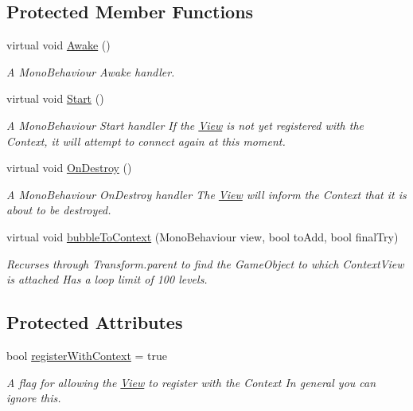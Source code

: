 \subsection*{Protected Member Functions}
\begin{DoxyCompactItemize}
\item 
virtual void \hyperlink{classstrange_1_1extensions_1_1mediation_1_1impl_1_1_view_ac8f8bc798a6729e44cc4f8d6dc3ee838}{Awake} ()
\begin{DoxyCompactList}\small\item\em A Mono\-Behaviour Awake handler. \end{DoxyCompactList}\item 
virtual void \hyperlink{classstrange_1_1extensions_1_1mediation_1_1impl_1_1_view_a9a876bf06590c1a1bacb243311489500}{Start} ()
\begin{DoxyCompactList}\small\item\em A Mono\-Behaviour Start handler If the \hyperlink{classstrange_1_1extensions_1_1mediation_1_1impl_1_1_view}{View} is not yet registered with the Context, it will attempt to connect again at this moment. \end{DoxyCompactList}\item 
virtual void \hyperlink{classstrange_1_1extensions_1_1mediation_1_1impl_1_1_view_a373a95c35d2d86746ed5db0512222767}{On\-Destroy} ()
\begin{DoxyCompactList}\small\item\em A Mono\-Behaviour On\-Destroy handler The \hyperlink{classstrange_1_1extensions_1_1mediation_1_1impl_1_1_view}{View} will inform the Context that it is about to be destroyed. \end{DoxyCompactList}\item 
virtual void \hyperlink{classstrange_1_1extensions_1_1mediation_1_1impl_1_1_view_a77b15b992a40cf3bfbf6d17c6f933a9c}{bubble\-To\-Context} (Mono\-Behaviour view, bool to\-Add, bool final\-Try)
\begin{DoxyCompactList}\small\item\em Recurses through Transform.\-parent to find the Game\-Object to which Context\-View is attached Has a loop limit of 100 levels. \end{DoxyCompactList}\end{DoxyCompactItemize}
\subsection*{Protected Attributes}
\begin{DoxyCompactItemize}
\item 
bool \hyperlink{classstrange_1_1extensions_1_1mediation_1_1impl_1_1_view_ad18a42c98cf565dcfae8f7444213fd71}{register\-With\-Context} = true
\begin{DoxyCompactList}\small\item\em A flag for allowing the \hyperlink{classstrange_1_1extensions_1_1mediation_1_1impl_1_1_view}{View} to register with the Context In general you can ignore this. \end{DoxyCompactList}\end{DoxyCompactItemize}
